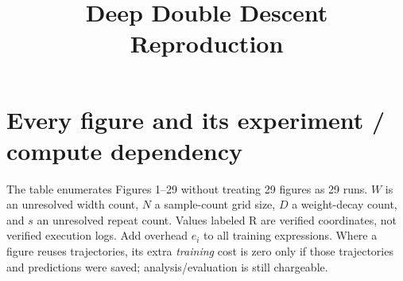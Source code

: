\documentclass{article}
\title{Deep Double Descent Reproduction}
\begin{document}
\onecolumn
\maketitle
\section{Every figure and its experiment / compute dependency}
The table enumerates Figures 1--29 without treating 29 figures as 29 runs.
$W$ is an unresolved width count, $N$ a sample-count grid size, $D$ a
weight-decay count, and $s$ an unresolved repeat count. Values labeled R are
verified coordinates, not verified execution logs. Add overhead $e_i$ to
all training expressions. Where a figure reuses trajectories, its extra
\emph{training} cost is zero only if those trajectories and predictions were
saved; analysis/evaluation is still chargeable.
\begingroup\small
\setlength{\tabcolsep}{4pt}\renewcommand{\arraystretch}{1.13}
\end{document}
